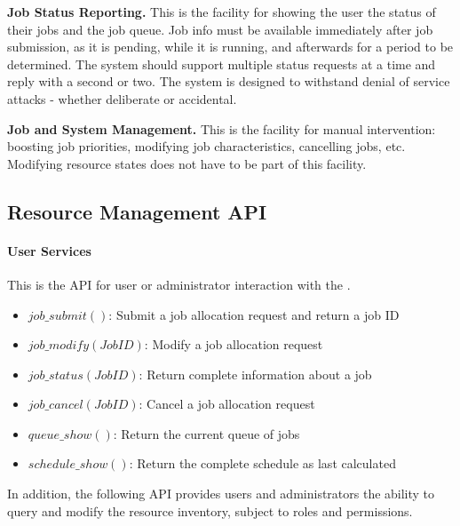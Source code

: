 \textbf{Job Status Reporting.} This is the facility for showing the
user the status of their jobs and the job queue.  Job info must be
available immediately after job submission, as it is pending, while it
is running, and afterwards for a period to be determined.  The system
should support multiple status requests at a time and reply with a
second or two.  The system is designed to withstand denial of service
attacks - whether deliberate or accidental.

\textbf{Job and System Management.} This is the facility for manual
intervention: boosting job priorities, modifying job characteristics,
cancelling jobs, etc.  Modifying resource states does not have to be
part of this facility.

\subsection{Resource Management API}

\paragraph{User Services}
This is the API for user or administrator interaction with the \ngrm.

\begin{itemize}
\item{$job\_submit()$: Submit a job allocation request and return a
  job ID}
\item{$job\_modify(JobID)$: Modify a job allocation request}
\item{$job\_status(JobID)$: Return complete information about a job}
\item{$job\_cancel(JobID)$: Cancel a job allocation request}
\item{$queue\_show()$: Return the current queue of jobs}
\item{$schedule\_show()$: Return the complete schedule as last
  calculated}
\end{itemize}

In addition, the following API provides users and administrators the
ability to query and modify the resource inventory, subject to roles
and permissions.


